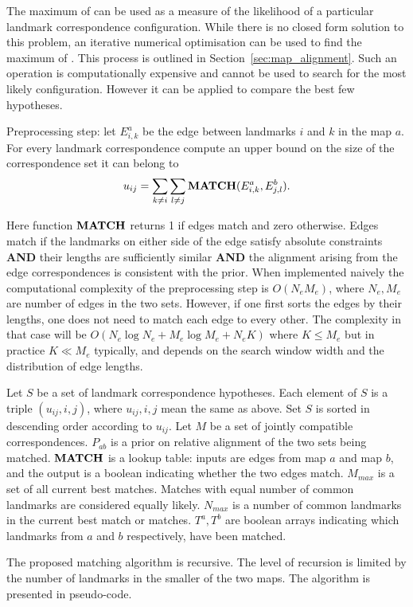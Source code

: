 The maximum of  can be used as a measure of
the likelihood of a particular landmark correspondence configuration.
While there is no closed form solution to this problem, an iterative
numerical optimisation can be used to find the maximum of
. This process is outlined in
Section~\ref{sec:map_alignment}. Such an operation is computationally
expensive and cannot be used to search for the most likely
configuration. However it can be applied to compare the best few
hypotheses.



Preprocessing step: let $E^a_{i,k}$ be the edge between landmarks $i$
and $k$ in the map $a$. For every landmark correspondence compute an
upper bound on the size of the correspondence set it can belong to
$$
u_{ij} = \sum_{k \ne i} \sum_{l \ne j} {\bf MATCH}(E^a_{i,k}, E^b_{j,l}).
$$

Here function ${\bf MATCH}$ returns 1 if edges match and zero
otherwise. Edges match if the landmarks on either side of the edge
satisfy absolute constraints {\bf AND} their lengths are sufficiently
similar {\bf AND} the alignment arising from the edge correspondences
is consistent with the prior. When implemented naively the
computational complexity of the preprocessing step is $O(N_eM_e)$,
where $N_e,M_e$ are number of edges in the two sets. However, if one
first sorts the edges by their lengths, one does not need to match
each edge to every other. The complexity in that case will be
$O(N_e\log N_e + M_e\log M_e + N_eK)$ where $K \leq M_e$ but in
practice $K \ll M_e$ typically, and depends on the search window width and the
distribution of edge lengths.

Let $S$ be a set of landmark correspondence hypotheses. Each element
of $S$ is a triple $(u_{ij}, i, j)$, where $u_{ij},i,j$ mean the same
as above. Set $S$ is sorted in descending order according to
$u_{ij}$. Let $M$ be a set of jointly compatible
correspondences. $P_{ab}$ is a prior on relative alignment of the two
sets being matched. ${\bf MATCH}$ is a lookup table: inputs are edges
from map $a$ and map $b$, and the output is a boolean indicating
whether the two edges match. $M_{max}$ is a set of all current best
matches. Matches with equal number of common landmarks are considered
equally likely. $N_{max}$ is a number of common landmarks in the
current best match or matches. $T^a,T^b$ are boolean arrays indicating
which landmarks from $a$ and $b$ respectively, have been matched.

The proposed matching algorithm is recursive. The level of recursion
is limited by the number of landmarks in the smaller of the two
maps. The algorithm is presented in pseudo-code.

